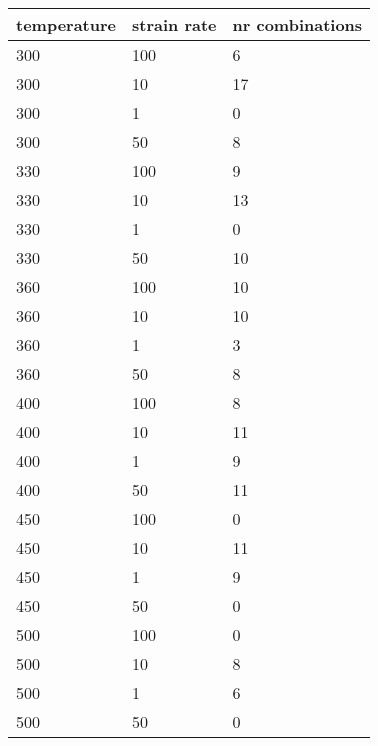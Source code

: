 \begin{tabular}{lll}
\toprule
temperature & strain rate & nr combinations \\
\midrule
        300 &         100 &               6 \\
        300 &          10 &              17 \\
        300 &           1 &               0 \\
        300 &          50 &               8 \\
        330 &         100 &               9 \\
        330 &          10 &              13 \\
        330 &           1 &               0 \\
        330 &          50 &              10 \\
        360 &         100 &              10 \\
        360 &          10 &              10 \\
        360 &           1 &               3 \\
        360 &          50 &               8 \\
        400 &         100 &               8 \\
        400 &          10 &              11 \\
        400 &           1 &               9 \\
        400 &          50 &              11 \\
        450 &         100 &               0 \\
        450 &          10 &              11 \\
        450 &           1 &               9 \\
        450 &          50 &               0 \\
        500 &         100 &               0 \\
        500 &          10 &               8 \\
        500 &           1 &               6 \\
        500 &          50 &               0 \\
\bottomrule
\end{tabular}
